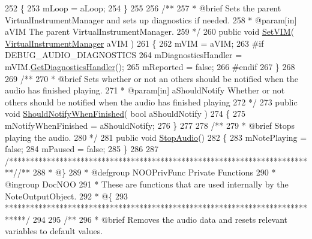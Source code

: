 \begin{DoxyCodeInclude}
252     \{
253         mLoop = aLoop;
254     \}
255 \textcolor{comment}{}
256 \textcolor{comment}{    /**}
257 \textcolor{comment}{     * @brief Sets the parent VirtualInstrumentManager and sets up diagnostics if needed.}
258 \textcolor{comment}{     * @param[in] aVIM The parent VirtualInstrumentManager.}
259 \textcolor{comment}{    */}
260     \textcolor{keyword}{public} \textcolor{keywordtype}{void} \hyperlink{group___n_o_o_pub_func_gaca261a6f8d95fc7f81bbc3c8108bad58}{SetVIM}( \hyperlink{class_virtual_instrument_manager}{VirtualInstrumentManager} aVIM )
261     \{
262         mVIM = aVIM;
263 \textcolor{preprocessor}{        #if DEBUG\_AUDIO\_DIAGNOSTICS}
264             mDiagnosticsHandler = mVIM.\hyperlink{group___v_i_m_pub_func_ga7e60bc3c5464d8f34f0d56def675bcc6}{GetDiagnosticsHandler}();
265             mReported = \textcolor{keyword}{false};
266 \textcolor{preprocessor}{        #endif}
267     \}
268 \textcolor{comment}{}
269 \textcolor{comment}{    /** }
270 \textcolor{comment}{     * @brief Sets whether or not an others should be notified when the audio has finished playing.}
271 \textcolor{comment}{     * @param[in] aShouldNotify Whether or not others should be notified when the audio has finished
       playing}
272 \textcolor{comment}{    */}
273     \textcolor{keyword}{public} \textcolor{keywordtype}{void} \hyperlink{group___n_o_o_pub_func_gab7bad1b7d462676843be9e0bbfa1c9fb}{ShouldNotifyWhenFinished}( \textcolor{keywordtype}{bool} aShouldNotify )
274     \{
275         mNotifyWhenFinished = aShouldNotify;
276     \}
277 \textcolor{comment}{}
278 \textcolor{comment}{    /**}
279 \textcolor{comment}{     * @brief Stops playing the audio.}
280 \textcolor{comment}{    */}
281     \textcolor{keyword}{public} \textcolor{keywordtype}{void} \hyperlink{group___n_o_o_pub_func_gae8a8e5bc027fd0186464a68399a4fecb}{StopAudio}()
282     \{
283         mNotePlaying = \textcolor{keyword}{false};
284         mPaused = \textcolor{keyword}{false};
285     \}
286 
287     \textcolor{comment}{/*************************************************************************/}\textcolor{comment}{/** }
288 \textcolor{comment}{    * @\}}
289 \textcolor{comment}{    * @defgroup NOOPrivFunc Private Functions}
290 \textcolor{comment}{    * @ingroup DocNOO}
291 \textcolor{comment}{    * These are functions that are used internally by the NoteOutputObject.}
292 \textcolor{comment}{    * @\{}
293 \textcolor{comment}{    *****************************************************************************/}
294 \textcolor{comment}{}
295 \textcolor{comment}{    /**}
296 \textcolor{comment}{     * @brief Removes the audio data and resets relevant variables to default values.}

\end{DoxyCodeInclude}
